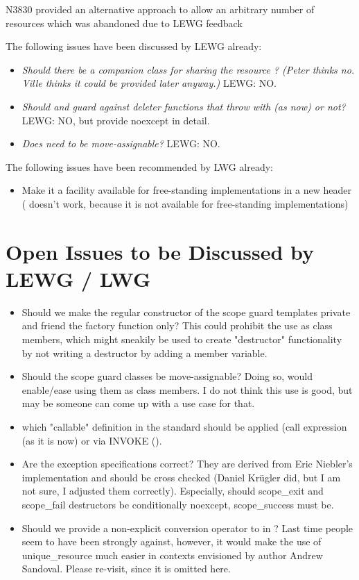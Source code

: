 \documentclass[ebook,11pt,article]{memoir}
\begin{document}
N3830 provided an alternative approach to allow an arbitrary number of resources which was abandoned due to LEWG feedback 

The following issues have been discussed by LEWG already:
\begin{itemize}
\item \textit{Should there be a companion class for sharing the resource  ?  (Peter thinks no. Ville thinks it could be provided later anyway.) } LEWG: NO.
\item \textit{Should  and  guard against deleter functions that throw with  (as now) or not?} LEWG: NO, but provide noexcept in detail.
\item \textit{Does  need to be move-assignable? } LEWG: NO.
\end{itemize}

The following issues have been recommended by LWG already:
\begin{itemize}
\item Make it a facility available for free-standing implementations in a new header  ( doesn't work, because it is not available for free-standing implementations)
\end{itemize}


\section{Open Issues to be Discussed by LEWG / LWG}
\begin{itemize}
\item Should we make the regular constructor of the scope guard templates private and friend the factory function only? This could prohibit the use as class members, which might sneakily be used to create "destructor" functionality by not writing a destructor by adding a  member variable. 
\item Should the scope guard classes be move-assignable? Doing so, would enable/ease using them as class members. I do not think this use is good, but may be someone can come up with a use case for that.
\item which "callable" definition in the standard should be applied (call expression (as it is now) or via INVOKE ().
\item Are the exception specifications correct? They are derived from Eric Niebler's implementation and should be cross checked (Daniel Kr\"ugler did, but I am not sure, I adjusted them correctly). Especially, should scope_exit and scope_fail destructors be conditionally noexcept, scope_success must be.
\item Should we provide a non-explicit conversion operator to  in  ? Last time people seem to have been strongly against, however, it would make the use of unique_resource much easier in contexts envisioned by author Andrew Sandoval. Please re-visit, since it is omitted here.
\end{itemize}
\end{document}
